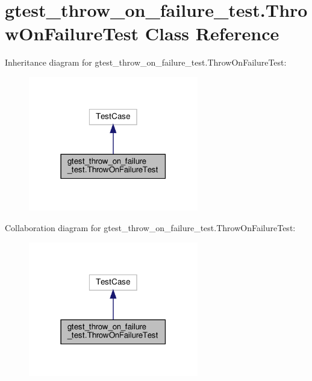 \hypertarget{classgtest__throw__on__failure__test_1_1_throw_on_failure_test}{}\section{gtest\+\_\+throw\+\_\+on\+\_\+failure\+\_\+test.\+Throw\+On\+Failure\+Test Class Reference}
\label{classgtest__throw__on__failure__test_1_1_throw_on_failure_test}


Inheritance diagram for gtest\+\_\+throw\+\_\+on\+\_\+failure\+\_\+test.\+Throw\+On\+Failure\+Test\+:
\nopagebreak
\begin{figure}[H]
\begin{center}
\leavevmode
\includegraphics[width=210pt]{classgtest__throw__on__failure__test_1_1_throw_on_failure_test__inherit__graph}
\end{center}
\end{figure}


Collaboration diagram for gtest\+\_\+throw\+\_\+on\+\_\+failure\+\_\+test.\+Throw\+On\+Failure\+Test\+:
\nopagebreak
\begin{figure}[H]
\begin{center}
\leavevmode
\includegraphics[width=210pt]{classgtest__throw__on__failure__test_1_1_throw_on_failure_test__coll__graph}
\end{center}
\end{figure}
